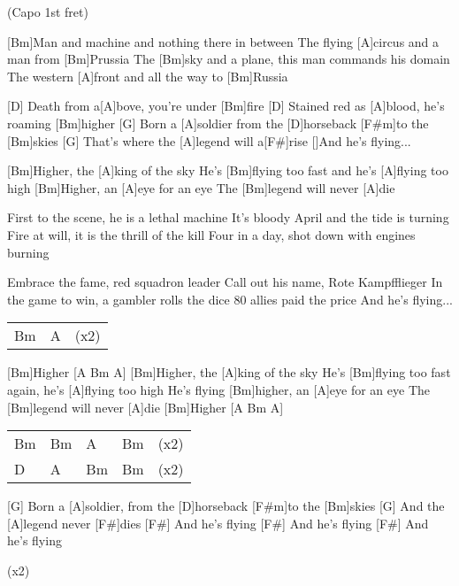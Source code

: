 
{\footnotesize(Capo 1st fret)}


\begin{guitar}
	[Bm]Man and machine and nothing there in between
	The flying [A]circus and a man from [Bm]Prussia
	The [Bm]sky and a plane, this man commands his domain
	The western [A]front and all the way to [Bm]Russia
	
	[D] Death from a[A]bove, you're under [Bm]fire
	[D] Stained red as [A]blood, he’s roaming [Bm]higher
	[G] Born a [A]soldier from the [D]horseback [F#m]to the [Bm]skies
	[G] That's where the [A]legend will a[F#]rise
	[]And he's flying...
	
	[Bm]Higher, the [A]king of the sky
	He’s [Bm]flying too fast and he's [A]flying too high
	[Bm]Higher, an [A]eye for an eye
	The [Bm]legend will never [A]die
	
	First to the scene, he is a lethal machine
	It's bloody April and the tide is turning
	Fire at will, it is the thrill of the kill
	Four in a day, shot down with engines burning
	
	Embrace the fame, red squadron leader
	Call out his name, Rote Kampfflieger
	In the game to win, a gambler rolls the dice
	80 allies paid the price
	And he's flying...
	
	 
	\pagebreak
	{\footnotesize\begin{tabular}{l|ll}
			Bm & A & (x2)
	\end{tabular}}
	
	[Bm]Higher [A  Bm A]{}
	[Bm]Higher, the [A]king of the sky
	He's [Bm]flying too fast again, he's [A]flying too high
	He’s flying [Bm]higher, an [A]eye for an eye
	The [Bm]legend will never [A]die
	[Bm]Higher [A  Bm A]
	
	{\footnotesize\begin{tabular}{l|l|l|ll}
			Bm & Bm & A & Bm & (x2)\\
			D & A & Bm & Bm & (x2)
	\end{tabular}}
	
	[G] Born a [A]soldier, from the [D]horseback [F#m]to the [Bm]skies
	[G] And the [A]legend never [F#]dies
	[F#] And he’s flying
	[F#] And he’s flying
	[F#] And he’s flying
	
	  (x2)
\end{guitar}